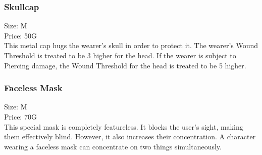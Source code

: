 \subsubsection{Skullcap}
Size: M\\
Price: 50G\\
This metal cap hugs the wearer's skull in order to protect it. The wearer's Wound Threshold is treated to be 3 higher for the head. If the wearer is subject to Piercing damage, the Wound Threshold for the head is treated to be 5 higher.\\

\subsubsection{Faceless Mask}
Size: M\\
Price: 70G\\
This special mask is completely featureless. It blocks the user's sight, making them effectively blind. However, it also increases their concentration. A character wearing a faceless mask can concentrate on two things simultaneously.\\